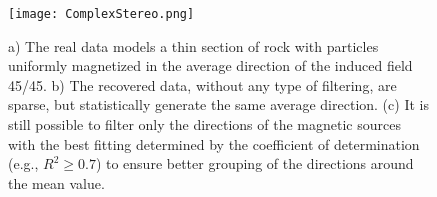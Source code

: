 \begin{singlespace}
\begin{figure}[hbpt]
\centering
\texttt{[image: ComplexStereo.png]}
\caption{a) The real data models a thin section of rock with particles uniformly magnetized in the average direction of the induced field 45\textdegree/45\textdegree. b) The recovered data, without any type of filtering, are sparse, but statistically generate the same average direction. (c) It is still possible to filter only the directions of the magnetic sources with the best fitting determined by the coefficient of determination (e.g., $R^ 2 \geq 0.7$) to ensure better grouping of the directions around the mean value.}
\label{fig:ComplexSynthetic3}
\end{figure}

\end{singlespace}